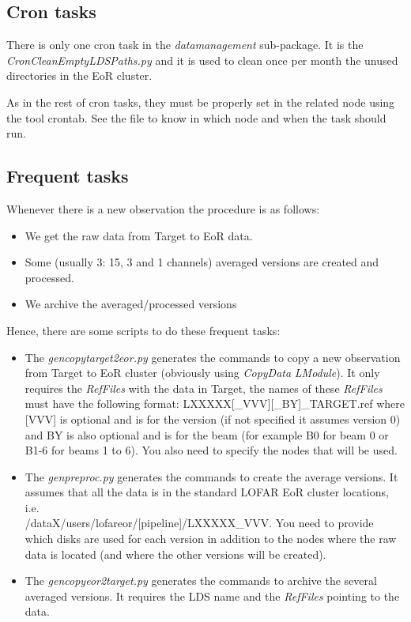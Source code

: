 \documentclass[a4paper,11pt]{article}
\begin{document}
\subsection{Cron tasks}

There is only one cron task in the \textit{datamanagement} sub-package. It is the  \textit{CronCleanEmptyLDSPaths.py} and it is used to clean once per month the unused directories in the EoR cluster.

As in the rest of cron tasks, they must be properly set in the related node using the tool crontab. See the file to know in which node and when the task should run.

\subsection{Frequent tasks}

Whenever there is a new observation the procedure is as follows: 

\begin{itemize}
	\item We get the raw data from Target to EoR data. 
	\item Some (usually 3: 15, 3 and 1 channels) averaged versions are created and processed.
	\item We archive the averaged/processed versions
\end{itemize}

Hence, there are some scripts to do these frequent tasks:

\begin{itemize}
	\item The \textit{gencopytarget2eor.py} generates the commands to copy a new observation from Target to EoR cluster (obviously using \textit{CopyData} \textit{LModule}). It only requires the \textit{RefFiles} with the data in Target, the names of these \textit{RefFiles} must have the following format: LXXXXX[\_VVV][\_BY]\_TARGET.ref where [VVV] is optional and is for the version (if not specified it assumes version 0) and BY is also optional and is for the beam (for example B0 for beam 0 or B1-6 for beams 1 to 6). You also need to specify the nodes that will be used. 
	\item The \textit{genpreproc.py} generates the commands to create the average versions. It assumes that all the data is in the standard LOFAR EoR cluster locations, i.e. \\ /dataX/users/lofareor/[pipeline]/LXXXXX\_VVV. You need to provide which disks are used for each version in addition to the nodes where the raw data is located (and where the other versions will be created).
	\item The \textit{gencopyeor2target.py} generates the commands to archive the several averaged versions. It requires the LDS name and the \textit{RefFiles} pointing to the data.  
\end{itemize} 
\end{document}

